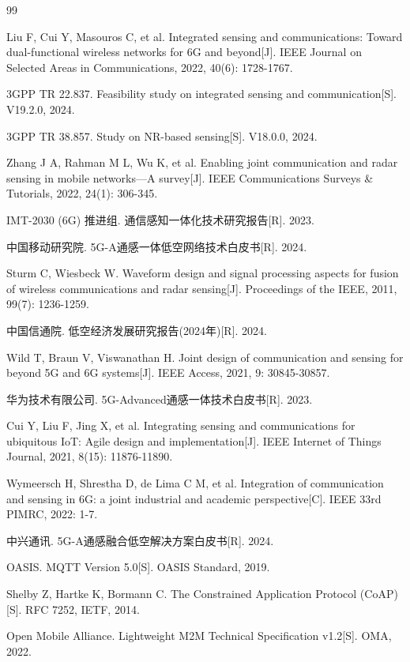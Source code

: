 \begin{thebibliography}{99}

 Liu F, Cui Y, Masouros C, et al. Integrated sensing and communications: Toward dual-functional wireless networks for 6G and beyond[J]. IEEE Journal on Selected Areas in Communications, 2022, 40(6): 1728-1767.

 3GPP TR 22.837. Feasibility study on integrated sensing and communication[S]. V19.2.0, 2024.

 3GPP TR 38.857. Study on NR-based sensing[S]. V18.0.0, 2024.

 Zhang J A, Rahman M L, Wu K, et al. Enabling joint communication and radar sensing in mobile networks—A survey[J]. IEEE Communications Surveys \& Tutorials, 2022, 24(1): 306-345.

 IMT-2030 (6G) 推进组. 通信感知一体化技术研究报告[R]. 2023.

 中国移动研究院. 5G-A通感一体低空网络技术白皮书[R]. 2024.

 Sturm C, Wiesbeck W. Waveform design and signal processing aspects for fusion of wireless communications and radar sensing[J]. Proceedings of the IEEE, 2011, 99(7): 1236-1259.

 中国信通院. 低空经济发展研究报告(2024年)[R]. 2024.

 Wild T, Braun V, Viswanathan H. Joint design of communication and sensing for beyond 5G and 6G systems[J]. IEEE Access, 2021, 9: 30845-30857.

 华为技术有限公司. 5G-Advanced通感一体技术白皮书[R]. 2023.

 Cui Y, Liu F, Jing X, et al. Integrating sensing and communications for ubiquitous IoT: Agile design and implementation[J]. IEEE Internet of Things Journal, 2021, 8(15): 11876-11890.

 Wymeersch H, Shrestha D, de Lima C M, et al. Integration of communication and sensing in 6G: a joint industrial and academic perspective[C]. IEEE 33rd PIMRC, 2022: 1-7.

 中兴通讯. 5G-A通感融合低空解决方案白皮书[R]. 2024.

 OASIS. MQTT Version 5.0[S]. OASIS Standard, 2019.

 Shelby Z, Hartke K, Bormann C. The Constrained Application Protocol (CoAP)[S]. RFC 7252, IETF, 2014.

 Open Mobile Alliance. Lightweight M2M Technical Specification v1.2[S]. OMA, 2022.

\end{thebibliography}
